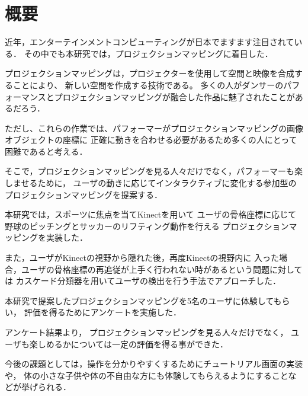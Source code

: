\chapter*{概要}

近年，エンターテインメントコンピューティングが日本でますます注目されている．
その中でも本研究では，プロジェクションマッピングに着目した．

プロジェクションマッピングは，プロジェクターを使用して空間と映像を合成することにより、
新しい空間を作成する技術である。
多くの人がダンサーのパフォーマンスとプロジェクションマッピングが融合した作品に魅了されたことがあるだろう．

ただし、これらの作業では、パフォーマーがプロジェクションマッピングの画像オブジェクトの座標に
正確に動きを合わせる必要があるため多くの人にとって困難であると考える．

そこで，プロジェクションマッピングを見る人々だけでなく，パフォーマーも楽しませるために，
ユーザの動きに応じてインタラクティブに変化する参加型のプロジェクションマッピングを提案する．

本研究では，スポーツに焦点を当てKinectを用いて
ユーザの骨格座標に応じて野球のピッチングとサッカーのリフティング動作を行える
プロジェクションマッピングを実装した．

また，ユーザがKinectの視野から隠れた後，再度Kinectの視野内に
入った場合，ユーザの骨格座標の再追従が上手く行われない時があるという問題に対しては
カスケード分類器を用いてユーザの検出を行う手法でアプローチした．

本研究で提案したプロジェクションマッピングを5名のユーザに体験してもらい，
評価を得るためにアンケートを実施した．

アンケート結果より，
プロジェクションマッピングを見る人々だけでなく，
ユーザも楽しめるかについては一定の評価を得る事ができた．

今後の課題としては，操作を分かりやすくするためにチュートリアル画面の実装や，
体の小さな子供や体の不自由な方にも体験してもらえるようにすることなどが挙げられる．